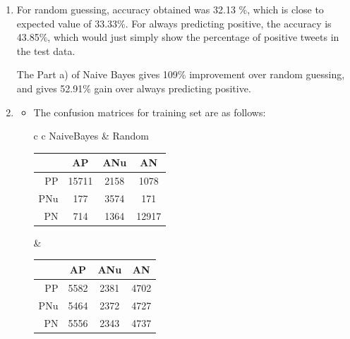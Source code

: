 \documentclass[12pt]{article}
\begin{document}
\begin{enumerate}[label=(\alph*)]
    \item For random guessing, accuracy obtained was 32.13 \%, which is close to expected value of 33.33\%. For always predicting positive, the accuracy is 43.85\%, which would just simply show the percentage of positive tweets in the test data.

          The Part a) of Naive Bayes gives 109\% improvement over random guessing, and gives 52.91\% gain over always predicting positive.

    \item \begin{itemize}
              \item The confusion matrices for training set are as follows:
                    \begin{center}
                        \begin{tabular}{c c}
                            NaiveBayes                    & Random \\
                            \begin{tabular}{r|c|c|c}
                                    & AP    & ANu  & AN    \\
                                \hline
                                PP  & 15711 & 2158 & 1078  \\
                                \hline
                                PNu & 177   & 3574 & 171   \\
                                \hline
                                PN  & 714   & 1364 & 12917 \\
                                \hline
                            \end{tabular} &
                            \begin{tabular}{r|c|c|c}
                                    & AP   & ANu  & AN   \\
                                \hline
                                PP  & 5582 & 2381 & 4702 \\
                                \hline
                                PNu & 5464 & 2372 & 4727 \\
                                \hline
                                PN  & 5556 & 2343 & 4737 \\
                                \hline
                            \end{tabular}
                        \end{tabular}
                    \end{center}

\end{itemize}
\end{enumerate}
\end{document}
